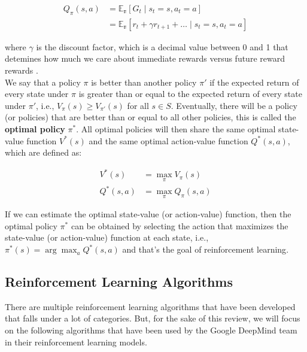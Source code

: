 \begin{equation}\label{eq:q_pi}
    \begin{split}
        Q_\pi(s, a) & = \mathbb{E_\pi}[G_t \mid s_t = s, a_t = a]                            \\
                    & = \mathbb{E_\pi}[r_t + \gamma r_{t+1}  + \ldots \mid s_t = s, a_t = a]
    \end{split}
\end{equation}

where $\gamma$ is the discount factor, which is a decimal value between 0 and 1
that detemines how much we care about immediate rewards versus future reward
rewards \cite{bg2}.\\

We say that a policy $\pi$ is better than another policy $\pi'$ if the expected
return of every state under $\pi$ is greater than or equal to the expected
return of every state under $\pi'$, i.e., $V_\pi(s) \geq V_{\pi'}(s)$ for all
$s \in S$. Eventually, there will be a policy (or policies) that are better
than or equal to all other policies, this is called the \textbf{optimal policy}
$\pi^*$. All optimal policies will then share the same optimal state-value
function $V^*(s)$ and the same optimal action-value function $Q^*(s, a)$, which
are defined as:

\begin{equation}
    \begin{split}
        V^*(s)    & = \max_\pi V_\pi(s)    \\
        Q^*(s, a) & = \max_\pi Q_\pi(s, a)
    \end{split}
\end{equation}

If we can estimate the optimal state-value (or action-value) function, then the
optimal policy $\pi^*$ can be obtained by selecting the action that maximizes
the state-value (or action-value) function at each state, i.e., $\pi^*(s) =
    \arg\max_a Q^*(s, a)$ and that's the goal of reinforcement learning\cite{bg2}.

\subsection{Reinforcement Learning Algorithms}
There are multiple reinforcement learning algorithms that have been developed
that falls under a lot of categories. But, for the sake of this review, we will
focus on the following algorithms that have been used by the Google DeepMind
team in their reinforcement learning models.\\

